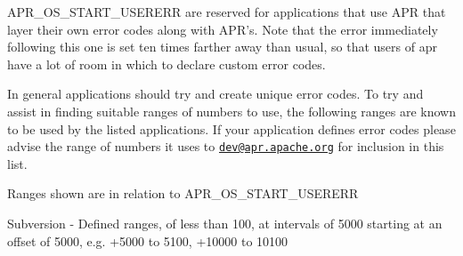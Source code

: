 A\-P\-R\-\_\-\-O\-S\-\_\-\-S\-T\-A\-R\-T\-\_\-\-U\-S\-E\-R\-E\-R\-R are reserved for applications that use A\-P\-R that layer their own error codes along with A\-P\-R's. Note that the error immediately following this one is set ten times farther away than usual, so that users of apr have a lot of room in which to declare custom error codes.

In general applications should try and create unique error codes. To try and assist in finding suitable ranges of numbers to use, the following ranges are known to be used by the listed applications. If your application defines error codes please advise the range of numbers it uses to \href{mailto:dev@apr.apache.org}{\tt dev@apr.\-apache.\-org} for inclusion in this list.

Ranges shown are in relation to A\-P\-R\-\_\-\-O\-S\-\_\-\-S\-T\-A\-R\-T\-\_\-\-U\-S\-E\-R\-E\-R\-R

Subversion -\/ Defined ranges, of less than 100, at intervals of 5000 starting at an offset of 5000, e.\-g. +5000 to 5100, +10000 to 10100

